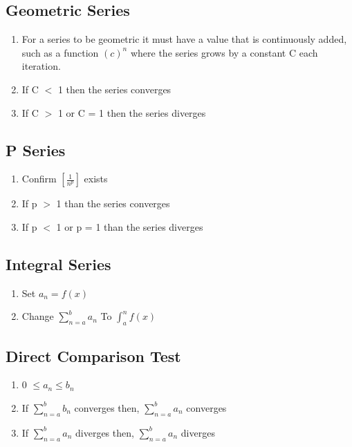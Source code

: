 \documentclass[12pt]{article}
\begin{document}
\subsection{Geometric Series}

\begin{enumerate}
\item For a series to be geometric it must have a value that is continuously added, such as a function $(c)^{n}$ where the series grows by a constant C each iteration.
\item If C $<$ 1 then the series converges
\item  If C $>$ 1 or C = 1 then the series diverges
\end{enumerate}


\subsection{P Series}

\begin{enumerate}
\item  Confirm $ \left [ \frac{1}{n^{p} } \right ]$ exists
\item If p $>$ 1 than the series converges
\item If p $<$ 1 or p = 1 than the series diverges
\end{enumerate}


\subsection{Integral Series}

\begin{enumerate}
\item  Set $a_n = f(x)$
\item Change $\sum\limits_{n=a}^{b} a_n$ To $\int_a^n f(x)$ 
\end{enumerate}


\subsection{Direct Comparison Test}

\begin{enumerate}
\item 0 $\leq a_n \leq  b_n$ 
\item If $\sum\limits_{n=a}^{b} b_n$ converges then, $\sum\limits_{n=a}^{b} a_n$  converges 
\item If $\sum\limits_{n=a}^{b} a_n$ diverges then, $\sum\limits_{n=a}^{b} a_n$  diverges 
\end{enumerate}
\end{document}
